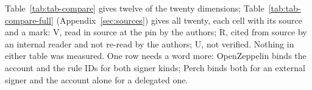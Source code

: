 Table~\ref{tab:tab-compare} gives twelve of the twenty dimensions;
Table~\ref{tab:tab-compare-full} (Appendix~\ref{sec:sources}) gives all twenty,
each cell with its source and a mark: V, read in source at the pin by the
authors; R, cited from source by an internal reader and not re-read by the
authors; U, not verified. Nothing in either table was measured. One row needs a
word more: OpenZeppelin  binds the account and the rule IDs for
both signer kinds; Perch binds both for an external signer and the account alone
for a delegated one.

